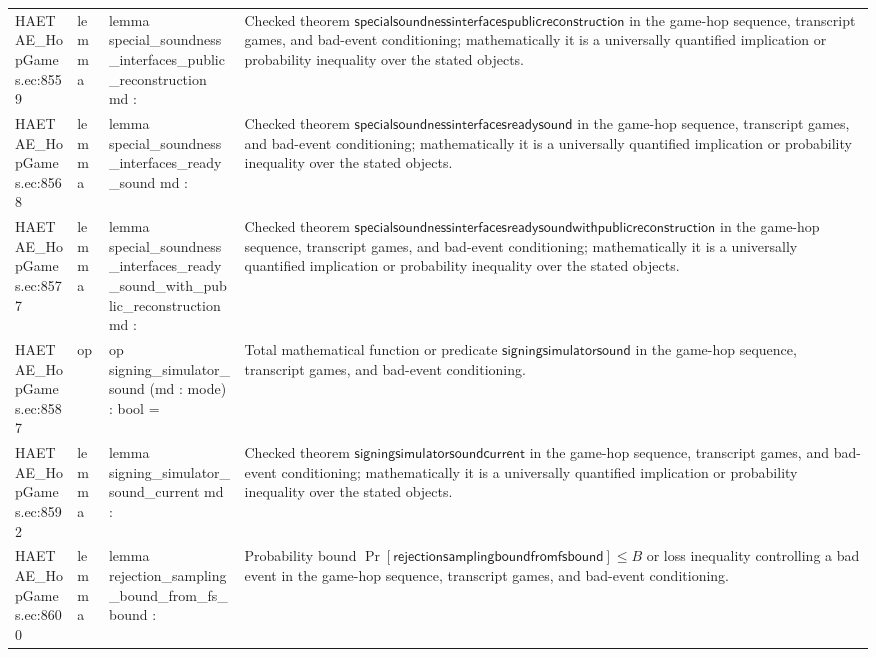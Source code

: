 \documentclass[10pt]{article}
\begin{document}
\begin{longtable}{L{0.11\textwidth}L{0.055\textwidth}L{0.385\textwidth}L{0.41\textwidth}}
HAETAE\_\allowbreak{}HopGames.\allowbreak{}ec:\allowbreak{}8559 & lemma & {\ttfamily\scriptsize lemma special\_\allowbreak{}soundness\_\allowbreak{}interfaces\_\allowbreak{}public\_\allowbreak{}reconstruction md :} & Checked theorem $\mathsf{specialsoundnessinterfacespublicreconstruction}$ in the game-hop sequence, transcript games, and bad-event conditioning; mathematically it is a universally quantified implication or probability inequality over the stated objects. \\
HAETAE\_\allowbreak{}HopGames.\allowbreak{}ec:\allowbreak{}8568 & lemma & {\ttfamily\scriptsize lemma special\_\allowbreak{}soundness\_\allowbreak{}interfaces\_\allowbreak{}ready\_\allowbreak{}sound md :} & Checked theorem $\mathsf{specialsoundnessinterfacesreadysound}$ in the game-hop sequence, transcript games, and bad-event conditioning; mathematically it is a universally quantified implication or probability inequality over the stated objects. \\
HAETAE\_\allowbreak{}HopGames.\allowbreak{}ec:\allowbreak{}8577 & lemma & {\ttfamily\scriptsize lemma special\_\allowbreak{}soundness\_\allowbreak{}interfaces\_\allowbreak{}ready\_\allowbreak{}sound\_\allowbreak{}with\_\allowbreak{}public\_\allowbreak{}reconstruction md :} & Checked theorem $\mathsf{specialsoundnessinterfacesreadysoundwithpublicreconstruction}$ in the game-hop sequence, transcript games, and bad-event conditioning; mathematically it is a universally quantified implication or probability inequality over the stated objects. \\
HAETAE\_\allowbreak{}HopGames.\allowbreak{}ec:\allowbreak{}8587 & op & {\ttfamily\scriptsize op signing\_\allowbreak{}simulator\_\allowbreak{}sound (md : mode) : bool =} & Total mathematical function or predicate $\mathsf{signingsimulatorsound}$ in the game-hop sequence, transcript games, and bad-event conditioning. \\
HAETAE\_\allowbreak{}HopGames.\allowbreak{}ec:\allowbreak{}8592 & lemma & {\ttfamily\scriptsize lemma signing\_\allowbreak{}simulator\_\allowbreak{}sound\_\allowbreak{}current md :} & Checked theorem $\mathsf{signingsimulatorsoundcurrent}$ in the game-hop sequence, transcript games, and bad-event conditioning; mathematically it is a universally quantified implication or probability inequality over the stated objects. \\
HAETAE\_\allowbreak{}HopGames.\allowbreak{}ec:\allowbreak{}8600 & lemma & {\ttfamily\scriptsize lemma rejection\_\allowbreak{}sampling\_\allowbreak{}bound\_\allowbreak{}from\_\allowbreak{}fs\_\allowbreak{}bound :} & Probability bound $\Pr[\mathsf{rejectionsamplingboundfromfsbound}]\le B$ or loss inequality controlling a bad event in the game-hop sequence, transcript games, and bad-event conditioning. \\

\end{longtable}
\end{document}
